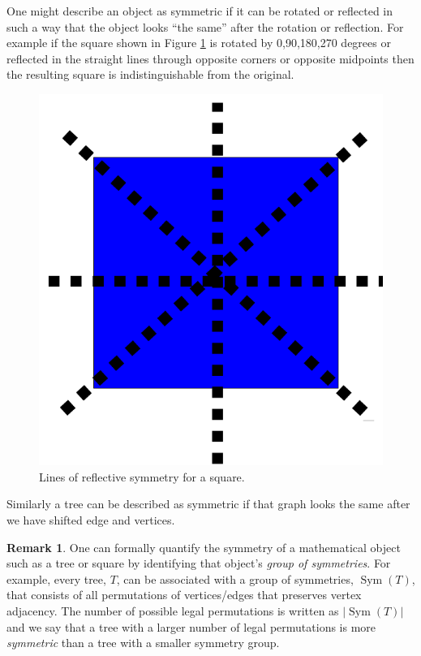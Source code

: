 \documentclass[10pt]{amsart} %
\theoremstyle{definition}
\newtheorem*{rem}{Remark}
\DeclareMathOperator{\Sym}{Sym}
\begin{document}
One might describe an object as symmetric if it can be rotated or reflected in such a way that the object looks ``the same'' 
after the rotation or reflection. For example if the square shown in Figure \ref{fig:a} is rotated by 0,90,180,270 degrees or
reflected in the straight lines through opposite corners or opposite midpoints then the resulting square is indistinguishable 
from the original.

\begin{figure}[h]

              \centering
               \includegraphics[scale=0.25]{square.png}
                \caption{Lines of reflective symmetry for a square.}\label{fig:a}
\end{figure}


Similarly a tree can be described as symmetric if that graph looks the same after we have 
shifted edge and vertices.    

\begin{rem}
One can formally quantify the symmetry of a mathematical object such as a tree or square by identifying that object's 
\emph{group of symmetries}.  For example, every tree, $T$, can be associated with a group of symmetries, $\Sym(T)$, that 
consists of all permutations of vertices/edges that preserves vertex adjacency. The number of possible legal permutations 
is written as $\lvert\Sym(T)\rvert$ and we say that a tree with a larger number of legal permutations is more \emph{symmetric}
than a tree with a smaller symmetry group.  
\end{rem}
\end{document}
